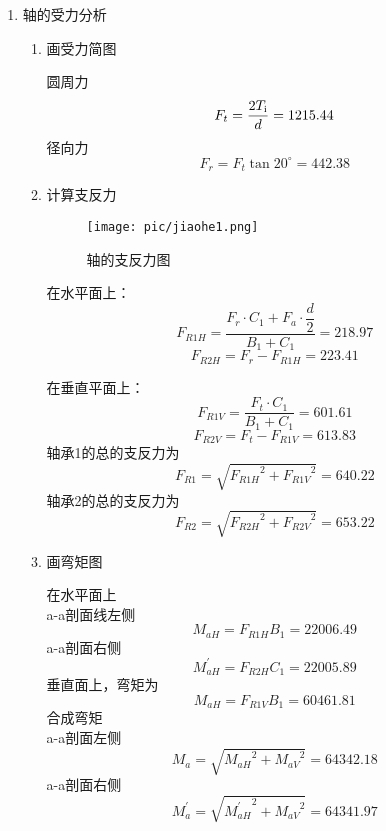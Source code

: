 \begin{enumerate}[A]
	\item 轴的受力分析
	\begin{enumerate}[a]
		\item 画受力简图
		\par 圆周力 $$F_t=\frac{2T_{\mathrm{{\uppercase\expandafter{\romannumeral1}}}}}{d}=1215.44$$
		径向力 $$F_r=F_t\tan{20^{\circ}}=442.38$$
		\item 计算支反力 
		\begin{figure}[H]
			\begin{center}
				\caption{轴\uppercase\expandafter{}的支反力图}
				\texttt{[image: pic/jiaohe1.png]}
			\end{center}
		\end{figure}
		\par 在水平面上：
		$$F_{R1H}=\dfrac{F_r\cdot C_1+F_a\cdot \dfrac{d}{2}}{B_1+C_1}=218.97$$
		$$F_{R2H}=F_r-F_{R1H}=223.41$$
		\par 在垂直平面上：
		$$F_{R1V}=\dfrac{F_t\cdot C_1}{B_1+C_1}=601.61$$
		$$F_{R2V}=F_t-F_{R1V}=613.83$$
		轴承1的总的支反力为
		$$F_{R1}=\sqrt{{F_{R1H}}^2+{F_{R1V}}^2}=640.22$$
		轴承2的总的支反力为
		$$F_{R2}=\sqrt{{F_{R2H}}^2+{F_{R2V}}^2}=653.22$$
		\item 画弯矩图
		\par 在水平面上 \\
		a-a剖面线左侧\\
		$$M_{aH}=F_{R1H}B_1=22006.49$$
		a-a剖面右侧 \\
		$$M^{\prime}_{aH}=F_{R2H}C_1=22005.89$$
		垂直面上，弯矩为\\
		$$M_{aH}=F_{R1V}B_1=60461.81$$
		合成弯矩\\
		a-a剖面左侧\\
		$$M_a=\sqrt{{M_{aH}}^2+{M_{aV}}^2}=64342.18$$
		a-a剖面右侧\\
		$$M^{\prime}_a=\sqrt{{M^{\prime}_{aH}}^2+{M_{aV}}^2}=64341.97$$
		

\end{enumerate}
\end{enumerate}
